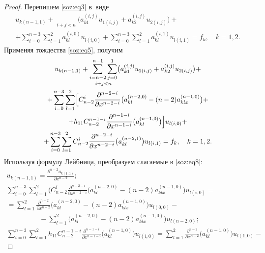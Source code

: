 \medskip

\begin{proof}
Перепишем \eqref{soz:eq3} в~виде
\begin{multline}
u_{k(n-1, 1)}+\mathop{\sum\limits_{i=n-2}^{n-1}\sum\limits_{j=0}^{1}}\limits_{i + j < n} \bigl(a_{k1}^{(i,j)}u_{1(i,j)}+a_{k2}^{(i,j)}u_{2(i,j)}\bigr)+
\\
+
\sum\limits_{i=0}^{n-3}\sum\limits_{l=1}^{2}a_{kl}^{(i,0)}u_{l(i,0)}+
\sum\limits_{i=0}^{n-3}\sum\limits_{l=1}^{2}a_{kl}^{(i,1)}u_{l(i,1)}=f_{k}, \quad  k=1,2.
\end{multline}
Применяя тождества \eqref{soz:eq5}, получим
\begin{multline}
\label{soz:eq8}
u_{k(n-1,1)}+\mathop{\sum\limits_{i=n-2}^{n-1}\sum\limits_{j=0}^{1}}\limits_{i + j < n} \bigl(a_{k1}^{(i,j)}u_{1(i,j)}+a_{k2}^{(i,j)}u_{2(i,j)}\bigr)+
\\
+
\sum\limits_{i=0}^{n-3}\sum\limits_{l=1}^{2}
\Bigl[C_{n-2}^{i}\frac{\partial^{n-2-i}}{\partial x^{n-2-i}}
\bigl(a_{kl}^{(n-2,0)}-(n-2)a_{klx}^{(n-1,0)}\bigr)+
\\
+h_{11}C_{n-2}^{n-1-i}\frac{\partial^{n-1-i}}{\partial x^{n-1-i}} \bigl(a_{kl}^{(n-1,0)}\bigr) \Bigr]u_{l(i,0)}+
\\
+
\sum\limits_{i=0}^{n-3}\sum\limits_{l=1}^{2}C_{n-2}^{i}\frac{\partial^{n-2-i}}{\partial x^{n-2-i}}
\bigl(a_{kl}^{(n-2,1)}\bigr)u_{l(i, 1)}=f_{k}, \quad  k=1, 2.
\end{multline}
Используя формулу Лейбница, преобразуем слагаемые в \eqref{soz:eq8}:
\begin{gather}
u_{k(n-1, 1)}=\frac{\partial^{n-2}u_{k(1,1)}}{\partial x^{n-2}};
\\
\sum\limits_{i=0}^{n-3}\sum\limits_{l=1}^{2} 
\bigl(C_{n-2}^{i}\frac{\partial^{n-2-i}}{\partial x^{n-2-i}}(a_{kl}^{(n-2,0)}-(n-2)a_{klx}^{(n-1,0)} \bigr)u_{l(i,0)}= \hspace{2cm}
\\
=\sum\limits_{l=1}^{2}\frac{\partial^{n-2}}{\partial x^{n-2}}
\bigl(a_{kl}^{(n-2,0)}-(n-2)a_{klx}^{(n-1,0)}\bigr)u_{l(0,0)}-
\\
\hspace{2cm}
-\sum\limits_{l=1}^{2}
\bigl(a_{kl}^{(n-2,0)}-(n-2)a_{klx}^{(n-1,0)}\bigr)u_{l(n-2,0)};
\label{soz:eq9}
\\
\sum\limits_{i=0}^{n-3}\sum\limits_{l=1}^{2}h_{11}C_{n-2}^{n-1-i}\frac{\partial^{n-1-i}}{\partial x^{n-1-i}}
\bigl(a_{kl}^{(n-1,0)}\bigr)u_{l(i,0)}=
\sum\limits_{l=1}^{2}\frac{\partial^{n-2}}{\partial x^{n-2}}\bigl(a_{kl}^{(n-1,0)}\bigr)u_{l(1,0)}-

\end{gather}
\end{proof}
